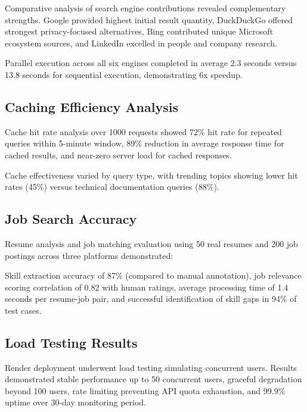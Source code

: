 \documentclass[conference]{IEEEtran}
\begin{document}
Comparative analysis of search engine contributions revealed complementary strengths. Google provided highest initial result quantity, DuckDuckGo offered strongest privacy-focused alternatives, Bing contributed unique Microsoft ecosystem sources, and LinkedIn excelled in people and company research.

Parallel execution across all six engines completed in average 2.3 seconds versus 13.8 seconds for sequential execution, demonstrating 6x speedup.


\subsection{Caching Efficiency Analysis}

Cache hit rate analysis over 1000 requests showed 72\% hit rate for repeated queries within 5-minute window, 89\% reduction in average response time for cached results, and near-zero server load for cached responses.

Cache effectiveness varied by query type, with trending topics showing lower hit rates (45\%) versus technical documentation queries (88\%).

\subsection{Job Search Accuracy}

Resume analysis and job matching evaluation using 50 real resumes and 200 job postings across three platforms demonstrated:

Skill extraction accuracy of 87\% (compared to manual annotation), job relevance scoring correlation of 0.82 with human ratings, average processing time of 1.4 seconds per resume-job pair, and successful identification of skill gaps in 94\% of test cases.


\subsection{Load Testing Results}

Render deployment underwent load testing simulating concurrent users. Results demonstrated stable performance up to 50 concurrent users, graceful degradation beyond 100 users, rate limiting preventing API quota exhaustion, and 99.9\% uptime over 30-day monitoring period.
\end{document}
